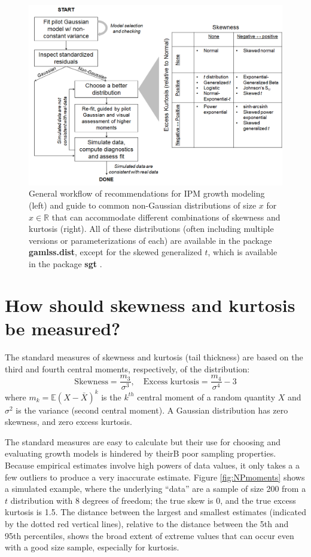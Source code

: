 \documentclass[11pt]{article}
\newcounter{box}
\newcommand{\be}{\begin{equation}}
\newcommand{\ee}{\end{equation}}
\begin{document}
{\begin{figure}
\centering
\includegraphics[width=\textwidth]{figures/workflow}
\caption{General workflow of recommendations for IPM growth modeling (left) and guide to common non-Gaussian distributions of size $x$ for $x \in \mathbb{R}$ that can accommodate different combinations of skewness and kurtosis (right). 
All of these distributions (often including multiple versions or parameterizations of each) are available in the package \textbf{gamlss.dist}, 
except for the skewed generalized $t$, which is available in the package \textbf{sgt} \citep{davis-2015}.}
\label{fig:workflow}
\end{figure} 

\section{How should skewness and kurtosis be measured?}
The standard measures of skewness and kurtosis (tail thickness) are based on the third and fourth central moments, respectively, of the distribution: 
\be
\mbox{Skewness} = \frac{m_3}{\sigma^3}, \quad \mbox{Excess kurtosis} = \frac{m_4}{\sigma^4}-3
\ee
where $m_k = \mathbb{E}(X - \bar{X})^k$ is the $k^{th}$ central moment of a random quantity $X$ 
and $\sigma^2$ is the variance (second central moment). A Gaussian distribution has zero skewness, 
and zero excess kurtosis. 

The standard measures are easy to calculate but their use for choosing and evaluating growth models is hindered by theirB
poor sampling properties. Because empirical estimates involve high powers of data values, it only takes a 
a few outliers to produce a very inaccurate estimate. Figure \ref{fig:NPmoments} shows a simulated example, where the
underlying ``data'' are a sample of size 200 from a $t$ distribution with 8 degrees of freedom; the true skew is 0, and the 
true excess kurtosis is 1.5. The distance between the largest and smallest estimates (indicated by the dotted red
vertical lines), relative to the distance between the 5th and 95th percentiles, shows the broad extent of 
extreme values that can occur even with a good size sample, especially for kurtosis. 

}
\end{document}
